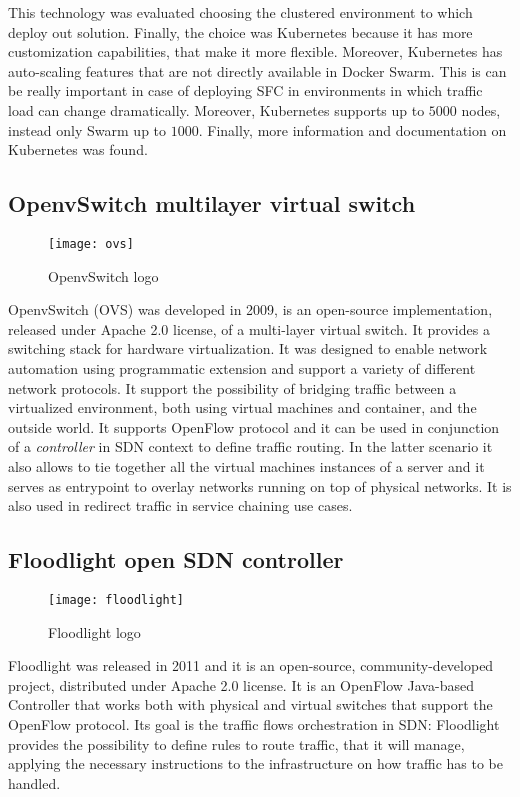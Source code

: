 This technology was evaluated choosing the clustered environment to which deploy
out solution. Finally, the choice was Kubernetes because it has more
customization capabilities, that make it more flexible. Moreover, Kubernetes has
auto-scaling features that are not directly available in Docker Swarm. This is
can be really important in case of deploying SFC in environments in which
traffic load can change dramatically. Moreover, Kubernetes supports up to $5000$
nodes, instead only Swarm up to $1000$. Finally, more information and
documentation on Kubernetes was found.

\subsection{OpenvSwitch multilayer virtual switch}
\begin{figure}[h]
 \centering \texttt{[image: ovs]}
 \caption{OpenvSwitch logo}
 \label{chap:prjan:img:ovs_logo}
\end{figure}
OpenvSwitch (OVS) was developed in 2009, is an open-source implementation,
released under Apache 2.0 license, of a multi-layer virtual switch. It provides
a switching stack for hardware virtualization. It was designed to enable network
automation using programmatic extension and support a variety of different
network protocols. It support the possibility of bridging traffic between a
virtualized environment, both using virtual machines and container, and the
outside world. It supports OpenFlow protocol and it can be used in conjunction
of a \emph{controller} in SDN context to define traffic routing. In the latter
scenario it also allows to tie together all the virtual machines instances
of a server and it serves as entrypoint to overlay networks running on top of
physical networks. It is also used in redirect traffic in service chaining use
cases.

\subsection{Floodlight open SDN controller}
\begin{figure}[h]
 \centering \texttt{[image: floodlight]}
 \caption{Floodlight logo}
 \label{chap:prjan:img:floodlight_logo}
\end{figure}
Floodlight was released in 2011 and it is an open-source, community-developed
project, distributed under Apache 2.0 license. It is an OpenFlow Java-based
Controller that works both with physical and virtual switches that support the
OpenFlow protocol. Its goal is the traffic flows orchestration in
SDN: Floodlight provides the possibility to define rules to route traffic, that
it will manage, applying the necessary instructions to the infrastructure on how
traffic has to be handled.

